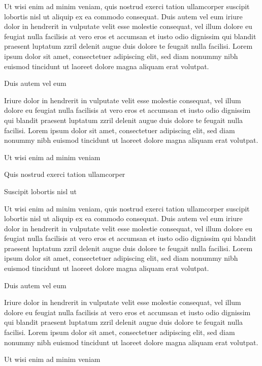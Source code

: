 \documentclass[11pt,twoside]{article}\makeatletter
\begin{document}
Ut wisi enim ad minim veniam, quis nostrud exerci tation       ullamcorper suscipit lobortis nisl ut aliquip ex ea commodo       consequat. Duis autem vel eum iriure dolor in hendrerit in vulputate       velit esse molestie consequat, vel illum dolore eu feugiat nulla       facilisis at vero eros et accumsan et iusto odio dignissim qui blandit       praesent luptatum zzril delenit augue duis dolore te feugait nulla       facilisi. Lorem ipsum dolor sit amet, consectetuer adipiscing elit,       sed diam nonummy nibh euismod tincidunt ut laoreet dolore magna       aliquam erat volutpat. \par
Duis autem vel eum \par
Iriure dolor in hendrerit in vulputate velit esse molestie       consequat, vel illum dolore eu feugiat nulla facilisis at vero eros et       accumsan et iusto odio dignissim qui blandit praesent luptatum zzril       delenit augue duis dolore te feugait nulla facilisi. Lorem ipsum dolor       sit amet, consectetuer adipiscing elit, sed diam nonummy nibh euismod       tincidunt ut laoreet dolore magna aliquam erat volutpat. \par
Ut wisi enim ad minim veniam\par
Quis nostrud exerci tation ullamcorper \par
Suscipit lobortis nisl ut \par
Ut wisi enim ad minim veniam, quis nostrud exerci tation       ullamcorper suscipit lobortis nisl ut aliquip ex ea commodo       consequat. Duis autem vel eum iriure dolor in hendrerit in vulputate       velit esse molestie consequat, vel illum dolore eu feugiat nulla       facilisis at vero eros et accumsan et iusto odio dignissim qui blandit       praesent luptatum zzril delenit augue duis dolore te feugait nulla       facilisi. Lorem ipsum dolor sit amet, consectetuer adipiscing elit,       sed diam nonummy nibh euismod tincidunt ut laoreet dolore magna       aliquam erat volutpat. \par
Duis autem vel eum \par
Iriure dolor in hendrerit in vulputate velit esse molestie       consequat, vel illum dolore eu feugiat nulla facilisis at vero eros et       accumsan et iusto odio dignissim qui blandit praesent luptatum zzril       delenit augue duis dolore te feugait nulla facilisi. Lorem ipsum dolor       sit amet, consectetuer adipiscing elit, sed diam nonummy nibh euismod       tincidunt ut laoreet dolore magna aliquam erat volutpat. \par
Ut wisi enim ad minim veniam\par
\end{document}
